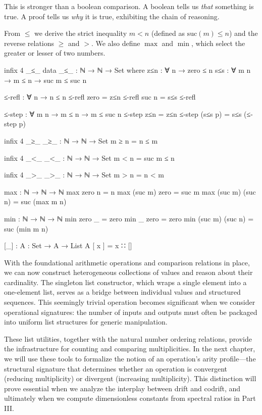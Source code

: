 \documentclass[11pt,a4paper]{book}
\begin{document}
This is stronger than a boolean comparison. A boolean tells us \emph{that} something 
is true. A proof tells us \emph{why} it is true, exhibiting the chain of reasoning.

From $\le$ we derive the strict inequality $m < n$ (defined as $\mathrm{suc}(m) \le n$) 
and the reverse relations $\ge$ and $>$. We also define $\max$ and $\min$, which select 
the greater or lesser of two numbers.

\begin{code}
infix 4 _≤_
data _≤_ : ℕ → ℕ → Set where
  z≤n : ∀ {n} → zero ≤ n
  s≤s : ∀ {m n} → m ≤ n → suc m ≤ suc n

≤-refl : ∀ {n} → n ≤ n
≤-refl {zero}  = z≤n
≤-refl {suc n} = s≤s ≤-refl

≤-step : ∀ {m n} → m ≤ n → m ≤ suc n
≤-step z≤n = z≤n
≤-step (s≤s p) = s≤s (≤-step p)

infix 4 _≥_
_≥_ : ℕ → ℕ → Set
m ≥ n = n ≤ m

infix 4 _<_
_<_ : ℕ → ℕ → Set
m < n = suc m ≤ n

infix 4 _>_
_>_ : ℕ → ℕ → Set
m > n = n < m

max : ℕ → ℕ → ℕ
max zero  n     = n
max (suc m) zero  = suc m
max (suc m) (suc n) = suc (max m n)

min : ℕ → ℕ → ℕ
min zero  _     = zero
min _     zero  = zero
min (suc m) (suc n) = suc (min m n)

[_] : {A : Set} → A → List A
[ x ] = x ∷ []
\end{code}

With the foundational arithmetic operations and comparison relations in place, we can now construct heterogeneous collections of values and reason about their cardinality. The singleton list constructor, which wraps a single element into a one-element list, serves as a bridge between individual values and structured sequences. This seemingly trivial operation becomes significant when we consider operational signatures: the number of inputs and outputs must often be packaged into uniform list structures for generic manipulation.

These list utilities, together with the natural number ordering relations, provide the infrastructure for counting and comparing multiplicities. In the next chapter, we will use these tools to formalize the notion of an operation's arity profile—the structural signature that determines whether an operation is convergent (reducing multiplicity) or divergent (increasing multiplicity). This distinction will prove essential when we analyze the interplay between drift and codrift, and ultimately when we compute dimensionless constants from spectral ratios in Part III.
\end{document}
